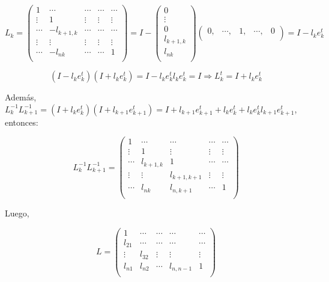 $$ L_{k} =
	\begin{pmatrix}
        1 & \cdots & \cdots & \cdots & \cdots\\
        \vdots & 1 & \vdots & \vdots & \vdots\\
        \cdots & -l_{k + 1, k} & \cdots & \cdots & \cdots\\
        \vdots & \vdots & \vdots & \vdots & \vdots\\
        \cdots & -l_{nk} & \cdots & \cdots & 1\\
	\end{pmatrix}
	=
	I -
	\begin{pmatrix}
        0\\
        \vdots\\
        0\\
        l_{k + 1, k}\\
        l_{nk}\\
	\end{pmatrix}
	\begin{pmatrix}
        0, & \cdots, & 1, & \cdots, & 0\\
	\end{pmatrix}
	= I - l_{k}e_{k}^{t}
$$

$$(I - l_{k}e_{k}^{t})(I + l_{k}e_{k}^{t}) = I - l_{k}e_{k}^{t}l_{k}e_{k}^{t} = I \Rightarrow L_{k}^{t} = I + l_{k}e_{k}^{t}$$

Adem\'as, $L_{k}^{-1}L_{k + 1}^{-1} = (I + l_{k}e_{k}^{t})(I + l_{k + 1}e_{k + 1}^{t}) = I + l_{k + 1}e_{k + 1}^{t} + l_{k}e_{k}^{t} + l_{k}e_{k}^{t}l_{k + 1}e_{k + 1}^{t}$, entonces:

$$ L_{k}^{-1}L_{k + 1}^{-1} =
	\begin{pmatrix}
        1 & \cdots & \cdots & \cdots & \cdots\\
        \vdots & 1 & \vdots & \vdots & \vdots\\
        \cdots & l_{k + 1, k} & 1 & \cdots & \cdots\\
        \vdots & \vdots & l_{k + 1, k + 1} & \vdots & \vdots\\
        \cdots & l_{nk} & l_{n,k + 1} & \cdots & 1\\
	\end{pmatrix}
$$

Luego,

$$ L =
	\begin{pmatrix}
        1 & \cdots & \cdots & \cdots & \cdots\\
        l_{21} & \cdots & \cdots & \cdots & \cdots\\
        \vdots & l_{32} & \vdots & \vdots & \vdots\\
        l_{n1} & l_{n2} & \cdots & l_{n, n - 1} & 1\\
	\end{pmatrix}
$$\\

